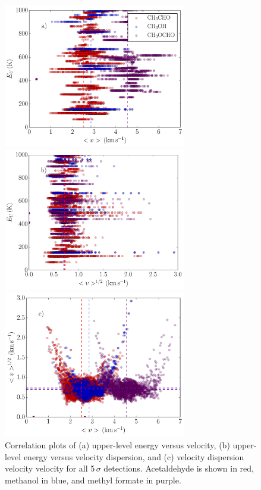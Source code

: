 \documentclass[iop,twocolappendix]{emulateapj}
\begin{document}
\begin{figure}
\begin{center}
\includegraphics[width=8cm]{Energy_mom1.pdf} 

\includegraphics[width=8cm]{Energy_mom2.pdf} 

\includegraphics[width=8cm]{mom2_mom1.pdf}
\caption{Correlation plots of (a) upper-level energy versus velocity, (b) upper-level energy versus velocity dispersion, and (c) velocity dispersion velocity velocity for all 5\,$\sigma$ detections. Acetaldehyde is shown in red, methanol in blue, and methyl formate in purple.}
\label{fig:correlations}
\end{center}
\end{figure}
\end{document}
